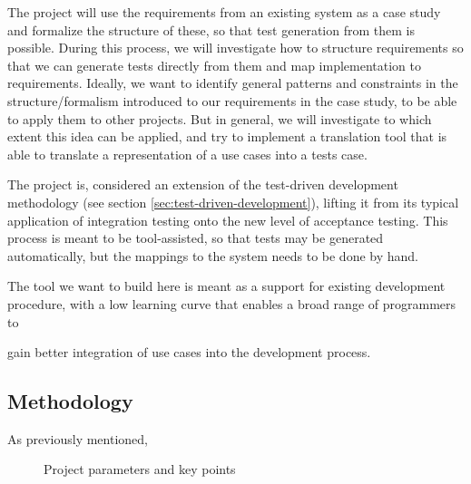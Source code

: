 \noindent The project will use the requirements from an existing system as a case study and formalize the structure of these, so that test generation from them is possible. During this process, we will investigate how to structure requirements so that we can generate tests directly from them and map implementation to requirements. Ideally, we want to identify general patterns and constraints in the structure/formalism introduced to our requirements in the case study, to be able to apply them to other projects. But in general, we will investigate to which extent this idea can be applied, and try to implement a translation tool that is able to translate a representation of a use cases into a tests case.\medskip

\noindent The project is, considered an extension of the test-driven development methodology (see section \ref{sec:test-driven-development}), lifting it from its typical application of integration testing onto the new level of acceptance testing. This process is meant to be tool-assisted, so that tests may be generated automatically, but the mappings to the system needs to be done by hand.

The tool we want to build here is meant as a support for existing development procedure, with a low learning curve that enables a broad range of programmers to 

gain better integration of use cases into the development process.

\subsection{Methodology}
As previously mentioned, 
\begin{figure}
\centering
{}
\caption{Project parameters and key points}
\label{fig:project_parameter_plot}
\end{figure}


